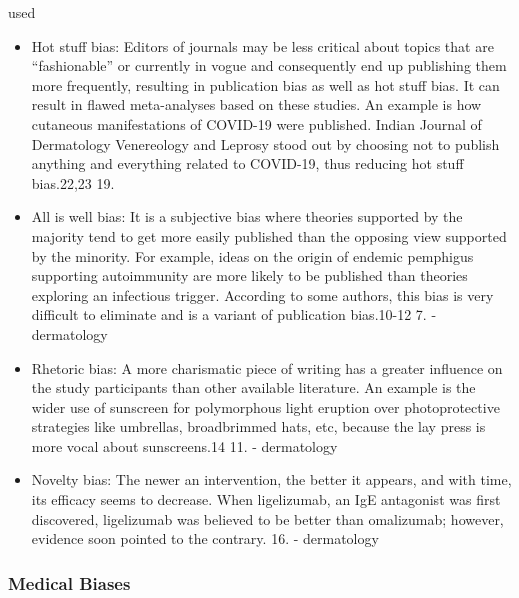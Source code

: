 \documentclass[12pt, a4paper, oneside]{book}   	%
\renewcommand{\paragraph}[1]{%
	\subsubsection*{#1}%
}
\newif\ifrawcitationactive
\newcommand{\rawcitationstart}{
	\color{purple}\rawcitationactivetrue
}
\newcommand{\rawcitationend}{
	\color{black}\rawcitationactivefalse
}
\newcommand{\rawcitationusedstart}{\color{violet}}
\newcommand{\rawcitationusedend}{%
	\ifrawcitationactive
	\color{purple}  %
	\else
	\color{black}  %
	\fi
}
\begin{document}
			\rawcitationstart
			used
			\begin{itemize}		
				\rawcitationusedstart
				\item Hot stuff bias: Editors of journals may be less critical about topics that are “fashionable” or currently in vogue and consequently end up publishing them more frequently, resulting in publication bias as well as hot stuff bias. It can result in flawed meta-analyses based on these studies. An example is how cutaneous manifestations of COVID-19 were published. Indian Journal of Dermatology Venereology and Leprosy stood out by choosing not to publish anything and everything related to COVID-19, thus reducing hot stuff bias.22,23 19. \autocite{Chakraborty_2024}
				\item All is well bias: It is a subjective bias where theories supported by the majority tend to get more easily published than the opposing view supported by the minority. For example, ideas on the origin of endemic pemphigus supporting autoimmunity are more likely to be published than theories exploring an infectious trigger. According to some authors, this bias is very difficult to eliminate and is a variant of publication bias.10-12 7.\autocite{Chakraborty_2024} - dermatology
				
				\item Rhetoric bias: A more charismatic piece of writing has a greater influence on the study participants than other available literature. An example is the wider use of sunscreen for polymorphous light eruption over photoprotective strategies like umbrellas, broadbrimmed hats, etc, because the lay press is more vocal about sunscreens.14 11. \autocite{Chakraborty_2024} - dermatology

				\item  Novelty bias: The newer an intervention, the better it appears, and with time, its efficacy seems to decrease. When ligelizumab, an IgE antagonist was first discovered, ligelizumab was believed to be better than omalizumab; however, evidence soon pointed to the contrary. 16.\autocite{Chakraborty_2024} - dermatology			
				\rawcitationusedend
			\end{itemize}
			\rawcitationend
			
			
			\paragraph{Medical Biases}
			
\end{document}
